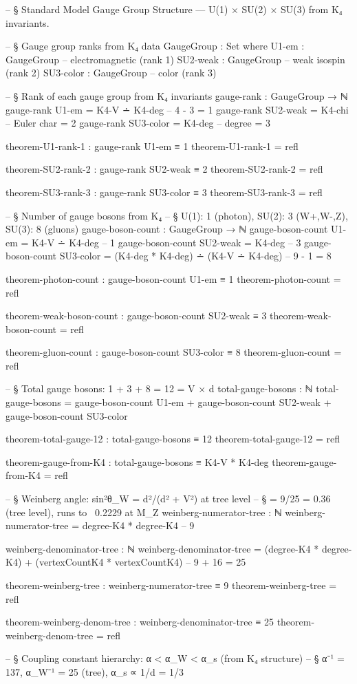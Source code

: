 \documentclass[11pt,a4paper]{book}
\begin{document}
\begin{code}
-- § Standard Model Gauge Group Structure — U(1) × SU(2) × SU(3) from K₄ invariants.

-- § Gauge group ranks from K₄
data GaugeGroup : Set where
  U1-em    : GaugeGroup   -- electromagnetic (rank 1)
  SU2-weak : GaugeGroup   -- weak isospin (rank 2)
  SU3-color : GaugeGroup  -- color (rank 3)

-- § Rank of each gauge group from K₄ invariants
gauge-rank : GaugeGroup → ℕ
gauge-rank U1-em     = K4-V ∸ K4-deg         -- 4 - 3 = 1
gauge-rank SU2-weak  = K4-chi                -- Euler char = 2
gauge-rank SU3-color = K4-deg                -- degree = 3

theorem-U1-rank-1 : gauge-rank U1-em ≡ 1
theorem-U1-rank-1 = refl

theorem-SU2-rank-2 : gauge-rank SU2-weak ≡ 2
theorem-SU2-rank-2 = refl

theorem-SU3-rank-3 : gauge-rank SU3-color ≡ 3
theorem-SU3-rank-3 = refl

-- § Number of gauge bosons from K₄
-- § U(1): 1 (photon), SU(2): 3 (W+,W-,Z), SU(3): 8 (gluons)
gauge-boson-count : GaugeGroup → ℕ
gauge-boson-count U1-em     = K4-V ∸ K4-deg                           -- 1
gauge-boson-count SU2-weak  = K4-deg                                  -- 3
gauge-boson-count SU3-color = (K4-deg * K4-deg) ∸ (K4-V ∸ K4-deg)    -- 9 - 1 = 8

theorem-photon-count : gauge-boson-count U1-em ≡ 1
theorem-photon-count = refl

theorem-weak-boson-count : gauge-boson-count SU2-weak ≡ 3
theorem-weak-boson-count = refl

theorem-gluon-count : gauge-boson-count SU3-color ≡ 8
theorem-gluon-count = refl

-- § Total gauge bosons: 1 + 3 + 8 = 12 = V × d
total-gauge-bosons : ℕ
total-gauge-bosons = gauge-boson-count U1-em + gauge-boson-count SU2-weak + gauge-boson-count SU3-color

theorem-total-gauge-12 : total-gauge-bosons ≡ 12
theorem-total-gauge-12 = refl

theorem-gauge-from-K4 : total-gauge-bosons ≡ K4-V * K4-deg
theorem-gauge-from-K4 = refl

-- § Weinberg angle: sin²θ_W = d²/(d² + V²) at tree level
-- § = 9/25 = 0.36 (tree level), runs to ~0.2229 at M_Z
weinberg-numerator-tree : ℕ
weinberg-numerator-tree = degree-K4 * degree-K4  -- 9

weinberg-denominator-tree : ℕ
weinberg-denominator-tree = (degree-K4 * degree-K4) + (vertexCountK4 * vertexCountK4)  -- 9 + 16 = 25

theorem-weinberg-tree : weinberg-numerator-tree ≡ 9
theorem-weinberg-tree = refl

theorem-weinberg-denom-tree : weinberg-denominator-tree ≡ 25
theorem-weinberg-denom-tree = refl

-- § Coupling constant hierarchy: α < α_W < α_s (from K₄ structure)
-- § α⁻¹ = 137, α_W⁻¹ = 25 (tree), α_s ∝ 1/d = 1/3
\end{code}
\end{document}
